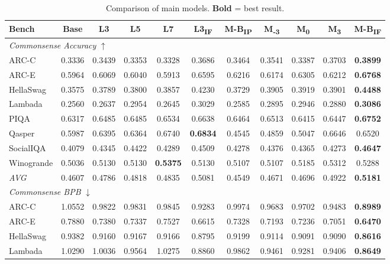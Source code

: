 \begin{table}[htbp]
\centering
\setlength{\tabcolsep}{2.5pt}
\caption{Comparison of main models. \textbf{Bold} = best result.}
\label{tab:main_results}
\begin{tabular}{lcccccccccc}
\toprule
Bench & Base & L3 & L5 & L7 & L3\textsubscript{IF} & M-B\textsubscript{IP} & M\textsubscript{-3} & M\textsubscript{0} & M\textsubscript{3} & M-B\textsubscript{IF} \\
\midrule
\multicolumn{11}{l}{\textit{Commonsense Accuracy} $\uparrow$} \\
ARC-C & 0.3336 & 0.3439 & 0.3353 & 0.3328 & 0.3686 & 0.3464 & 0.3541 & 0.3387 & 0.3703 & \textbf{0.3899} \\
ARC-E & 0.5964 & 0.6069 & 0.6040 & 0.5913 & 0.6595 & 0.6216 & 0.6174 & 0.6305 & 0.6212 & \textbf{0.6768} \\
HellaSwag & 0.3575 & 0.3789 & 0.3800 & 0.3857 & 0.4230 & 0.3729 & 0.3905 & 0.3919 & 0.3901 & \textbf{0.4488} \\
Lambada & 0.2560 & 0.2637 & 0.2954 & 0.2645 & 0.3029 & 0.2585 & 0.2895 & 0.2946 & 0.2880 & \textbf{0.3086} \\
PIQA & 0.6317 & 0.6485 & 0.6485 & 0.6534 & 0.6638 & 0.6464 & 0.6513 & 0.6415 & 0.6447 & \textbf{0.6752} \\
Qasper & 0.5987 & 0.6395 & 0.6364 & 0.6740 & \textbf{0.6834} & 0.4545 & 0.4859 & 0.5047 & 0.6646 & 0.6520 \\
SocialIQA & 0.4079 & 0.4345 & 0.4422 & 0.4289 & 0.4509 & 0.4278 & 0.4376 & 0.4365 & 0.4273 & \textbf{0.4647} \\
Winogrande & 0.5036 & 0.5130 & 0.5130 & \textbf{0.5375} & 0.5130 & 0.5107 & 0.5107 & 0.5185 & 0.5312 & 0.5288 \\
\textit{AVG} & 0.4607 & 0.4786 & 0.4818 & 0.4835 & 0.5081 & 0.4549 & 0.4671 & 0.4696 & 0.4922 & \textbf{0.5181} \\
\midrule
\multicolumn{11}{l}{\textit{Commonsense BPB} $\downarrow$} \\
ARC-C & 1.0552 & 0.9822 & 0.9831 & 0.9845 & 0.9283 & 0.9974 & 0.9683 & 0.9702 & 0.9483 & \textbf{0.8989} \\
ARC-E & 0.7880 & 0.7380 & 0.7337 & 0.7527 & 0.6615 & 0.7328 & 0.7193 & 0.7236 & 0.7051 & \textbf{0.6470} \\
HellaSwag & 0.9382 & 0.9160 & 0.9167 & 0.9166 & 0.8795 & 0.9199 & 0.9114 & 0.9091 & 0.9090 & \textbf{0.8616} \\
Lambada & 1.0290 & 1.0036 & 0.9564 & 1.0275 & 0.8860 & 0.9862 & 0.9461 & 0.9281 & 0.9406 & \textbf{0.8649} \\

\end{tabular}
\end{table}
